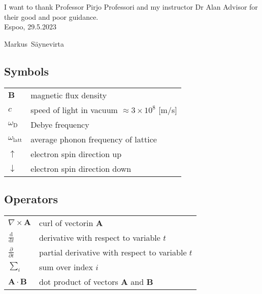\documentclass[english, 12pt, a4paper, elec, utf8, a-1b, online]{aaltothesis}
\begin{document}
I want to thank Professor Pirjo Professori and my instructor Dr Alan Advisor for 
their good and poor guidance.\\

\vspace{5cm}
Espoo, 29.5.2023

\vspace{5mm}
{\hfill Markus\ Säynevirta \hspace{1cm}}

\newpage


\thesistableofcontents



\subsection*{Symbols}

\begin{tabular}{ll}
$\mathbf{B}$  & magnetic flux density  \\
$c$              & speed of light in vacuum $\approx 3\times10^8$ [m/s]\\
$\omega_{\mathrm{D}}$    & Debye frequency \\
$\omega_{\mathrm{latt}}$ & average phonon frequency of lattice \\
$\uparrow$       & electron spin direction up\\
$\downarrow$     & electron spin direction down
\end{tabular}

\subsection*{Operators}

\begin{tabular}{ll}
$\nabla \times \mathbf{A}$              & curl of vectorin $\mathbf{A}$\\
$\displaystyle\frac{\mbox{d}}{\mbox{d} t}$ & derivative with respect to 
variable $t$\\[3mm]
$\displaystyle\frac{\partial}{\partial t}$  & partial derivative with respect 
to variable $t$ \\[3mm]
$\sum_i $                       & sum over index $i$\\
$\mathbf{A} \cdot \mathbf{B}$    & dot product of vectors $\mathbf{A}$ and 
$\mathbf{B}$
\end{tabular}
\end{document}
